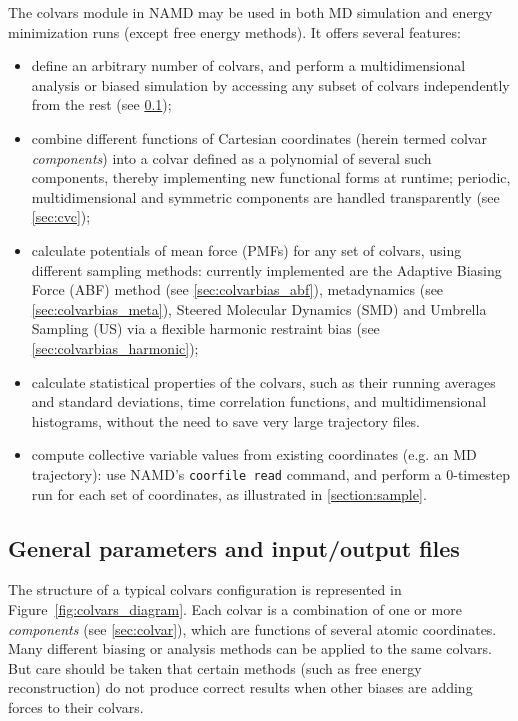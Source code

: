 The colvars module in NAMD may be used in both MD simulation and
energy minimization runs (except free energy methods).
It offers several features:
\begin{itemize}

\item define an arbitrary number of colvars, and perform a
  multidimensional analysis or biased simulation by accessing any
  subset of colvars independently from the rest (see
  \ref{sec:colvarmodule});

\item combine different functions of Cartesian coordinates (herein
  termed colvar \emph{components}) into a colvar defined as a
  polynomial of several such components, thereby implementing new
  functional forms at runtime; periodic, multidimensional and
  symmetric components are handled transparently (see \ref{sec:cvc});

\item calculate potentials of mean force (PMFs) for any set of
  colvars, using different sampling methods: currently implemented are
  the Adaptive Biasing Force (ABF) method (see
  \ref{sec:colvarbias_abf}), metadynamics (see
  \ref{sec:colvarbias_meta}), Steered Molecular Dynamics (SMD) and
  Umbrella Sampling (US) via a flexible harmonic restraint bias (see
  \ref{sec:colvarbias_harmonic});

\item calculate statistical properties of the colvars, such as their
  running averages and standard deviations, time correlation
  functions, and multidimensional histograms, without the need to save
  very large trajectory files.

\item compute collective variable values from existing coordinates
(e.g. an MD trajectory): use NAMD's \texttt{coorfile read} command,
and perform a 0-timestep run for each set of coordinates, as
illustrated in \ref{section:sample}. 
\end{itemize}


\subsection{General parameters and input/output files}
\label{sec:colvarmodule}

The structure of a typical colvars configuration is represented in
Figure~\ref{fig:colvars_diagram}.  Each colvar is a combination of one
or more \emph{components} (see \ref{sec:colvar}), which are functions
of several atomic coordinates.  Many different biasing or analysis
methods can be applied to the same colvars.  But care should be taken
that certain methods (such as free energy reconstruction) do not
produce correct results when other biases are adding forces to their
colvars.

